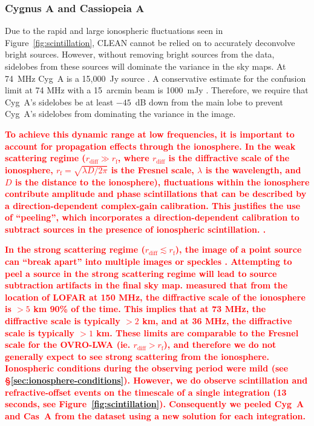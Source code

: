 \documentclass[twocolumn]{aastex61}
\newcommand{\revision}[1]{\textcolor{red}{\textbf{#1}}}
\begin{document}
\subsubsection{Cygnus A and Cassiopeia A}

Due to the rapid and large ionospheric fluctuations seen in Figure~\ref{fig:scintillation}, CLEAN
cannot be relied on to accurately deconvolve bright sources.  However, without removing bright
sources from the data, sidelobes from these sources will dominate the variance in the sky maps.  At
74~MHz Cyg~A is a 15,000~Jy source \citep{1977A&A....61...99B}. A conservative estimate for the
confusion limit at 74 MHz with a 15~arcmin beam is 1000~mJy \citep{2014MNRAS.440..327L}. Therefore,
we require that Cyg~A's sidelobes be at least $-45$~dB down from the main lobe to prevent Cyg~A's
sidelobes from dominating the variance in the image.

\revision{
    To achieve this dynamic range at low frequencies, it is important to account for propagation
    effects through the ionosphere. In the weak scattering regime ($r_\text{diff} \gg r_\text{f}$,
    where $r_\text{diff}$ is the diffractive scale of the ionosphere, $r_\text{f} =
    \sqrt{\lambda D / 2\pi}$ is the Fresnel scale, $\lambda$ is the wavelength, and $D$ is the
    distance to the ionosphere), fluctuations within the ionosphere contribute
    amplitude and phase scintillations that can be described by a direction-dependent complex-gain
    calibration. This justifies the use of ``peeling'', which incorporates a direction-dependent
    calibration to subtract sources in the presence of ionospheric scintillation.
    \citep[eg.][]{2008ISTSP...2..707M, 2015MNRAS.449.2668S}.
}

\revision{
    In the strong scattering regime ($r_\text{diff} \lesssim r_\text{f}$), the image of a point
    source can ``break apart'' into multiple images or speckles \citep{2015MNRAS.453..925V}.
    Attempting to peel a source in the strong scattering regime will lead to source subtraction
    artifacts in the final sky map.  \citet{2016RaSc...51..927M} measured that from the location of
    LOFAR at 150 MHz, the diffractive scale of the ionosphere is $>5$ km 90\% of the time. This
    implies that at 73 MHz, the diffractive scale is typically $>2$ km, and at 36 MHz, the
    diffractive scale is typically $>1$ km. These limits are comparable to the Fresnel scale for the
    OVRO-LWA (ie. $r_\text{diff} > r_\text{f}$), and therefore we do not generally expect to see
    strong scattering from the ionosphere.  Ionospheric conditions during the observing period were
    mild (see \S\ref{sec:ionosphere-conditions}). However, we do observe scintillation and
    refractive-offset events on the timescale of a single integration (13 seconds, see
    Figure~\ref{fig:scintillation}). Consequently we peeled Cyg~A and Cas~A from the dataset using a
    new solution for each integration.
}
\end{document}
